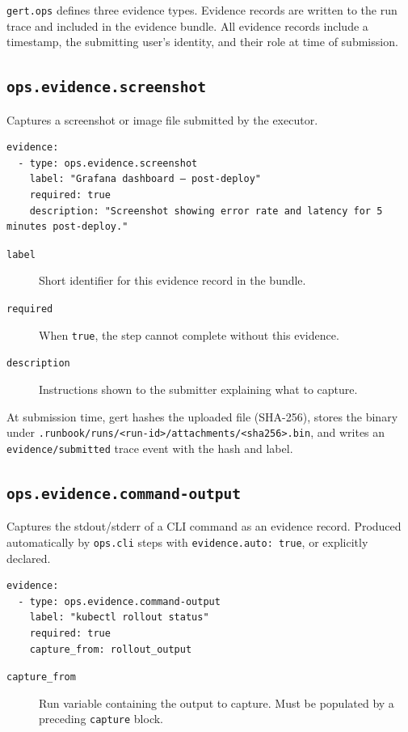 \texttt{gert.ops} defines three evidence types. Evidence records are written to the run trace
and included in the evidence bundle. All evidence records include a timestamp, the submitting
user's identity, and their role at time of submission.

\subsection{\texttt{ops.evidence.screenshot}}

Captures a screenshot or image file submitted by the executor.

\begin{verbatim}
evidence:
  - type: ops.evidence.screenshot
    label: "Grafana dashboard — post-deploy"
    required: true
    description: "Screenshot showing error rate and latency for 5 minutes post-deploy."
\end{verbatim}

\begin{description}
  \item[\texttt{label}] Short identifier for this evidence record in the bundle.
  \item[\texttt{required}] When \texttt{true}, the step cannot complete without this evidence.
  \item[\texttt{description}] Instructions shown to the submitter explaining what to capture.
\end{description}

At submission time, gert hashes the uploaded file (SHA-256), stores the binary under
\texttt{.runbook/runs/<run-id>/attachments/<sha256>.bin}, and writes an
\texttt{evidence/submitted} trace event with the hash and label.

\subsection{\texttt{ops.evidence.command-output}}

Captures the stdout/stderr of a CLI command as an evidence record. Produced automatically
by \texttt{ops.cli} steps with \texttt{evidence.auto: true}, or explicitly declared.

\begin{verbatim}
evidence:
  - type: ops.evidence.command-output
    label: "kubectl rollout status"
    required: true
    capture_from: rollout_output
\end{verbatim}

\begin{description}
  \item[\texttt{capture\_from}] Run variable containing the output to capture. Must be
    populated by a preceding \texttt{capture} block.
\end{description}

